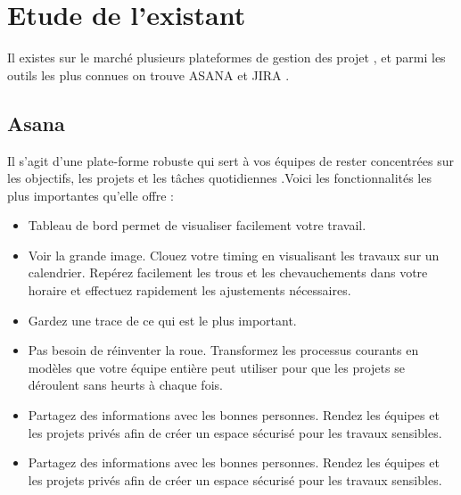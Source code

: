 \section{ Etude de l'existant  }
Il existes sur le march\'{e} plusieurs plateformes de gestion des projet , et parmi
les outils les plus connues on trouve ASANA et JIRA .

\subsection{Asana}

Il s'agit d'une plate-forme robuste qui sert \`{a} vos \'{e}quipes de rester concentr\'{e}es
sur les objectifs, les projets et les t\^{a}ches quotidiennes .Voici les
fonctionnalit\'{e}s les plus importantes qu'elle offre :


\begin{itemize}
\item{Tableau de bord permet de visualiser facilement votre travail.}

\item{ Voir la grande image. Clouez votre timing en visualisant les travaux sur
un calendrier. Rep\'{e}rez facilement les trous et les chevauchements dans
votre horaire et effectuez rapidement les ajustements n\'{e}cessaires.}

\item{Gardez une trace de ce qui est le plus important.}

\item{Pas besoin de r\'{e}inventer la roue. Transformez les processus courants en
mod\`{e}les que votre \'{e}quipe enti\`{e}re peut utiliser pour que les projets se
d\'{e}roulent sans heurts \`{a} chaque fois.}

\item{Partagez des informations avec les bonnes personnes. Rendez les
\'{e}quipes et les projets priv\'{e}s afin de cr\'{e}er un espace s\'{e}curis\'{e} pour les
travaux sensibles.}

\item{Partagez des informations avec les bonnes personnes. Rendez les
\'{e}quipes et les projets priv\'{e}s afin de cr\'{e}er un espace s\'{e}curis\'{e} pour les
travaux sensibles.}

\end{itemize}

